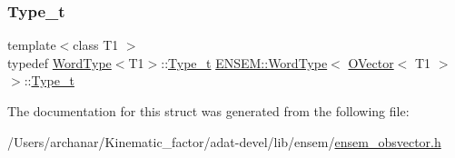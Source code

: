 \subsubsection{\texorpdfstring{Type\_t}{Type\_t}\hspace{0.1cm}{\footnotesize\ttfamily [3/3]}}
{\footnotesize\ttfamily template$<$class T1 $>$ \\
typedef \mbox{\hyperlink{structENSEM_1_1WordType}{Word\+Type}}$<$T1$>$\+::\mbox{\hyperlink{structENSEM_1_1WordType_3_01OVector_3_01T1_01_4_01_4_ab09c111517a85cf22c58611d96219000}{Type\+\_\+t}} \mbox{\hyperlink{structENSEM_1_1WordType}{E\+N\+S\+E\+M\+::\+Word\+Type}}$<$ \mbox{\hyperlink{classENSEM_1_1OVector}{O\+Vector}}$<$ T1 $>$ $>$\+::\mbox{\hyperlink{structENSEM_1_1WordType_3_01OVector_3_01T1_01_4_01_4_ab09c111517a85cf22c58611d96219000}{Type\+\_\+t}}}



The documentation for this struct was generated from the following file\+:\begin{DoxyCompactItemize}
\item 
/\+Users/archanar/\+Kinematic\+\_\+factor/adat-\/devel/lib/ensem/\mbox{\hyperlink{adat-devel_2lib_2ensem_2ensem__obsvector_8h}{ensem\+\_\+obsvector.\+h}}\end{DoxyCompactItemize}
